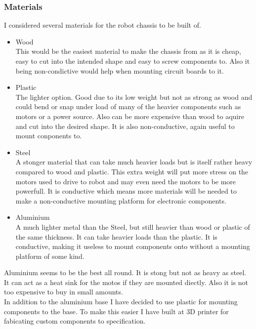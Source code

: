 \documentclass[11pt,fleqn,twoside]{article}
\begin{document}
\subsubsection{Materials}
I considered several materials for the robot chassis to be built of.
\begin{itemize}
\item Wood
\\This would be the easiest material to make the chassis from as it is cheap, easy to cut into the intended shape and easy to screw components to.  Also it being non-condictive would help when mounting circuit boards to it.
\item Plastic
\\The lighter option.  Good due to its low weight but not as strong as wood and could bend or snap under load of many of the heavier components such as motors or a power source.  Also can be more expensive than wood to aquire and cut into the desired shape.  It is also non-conductive, again useful to mount conponents to.
\item Steel
\\A stonger material that can take much heavier loads but is itself rather heavy compared to wood and plastic.  This extra weight will put more stress on the motors used to drive to robot and may even need the motors to be more powerfull.  It is conductive which means more materials will be needed to make a non-conductive mounting platform for electronic components.
\item Aluminium
\\A much lighter metal than the Steel, but still heavier than wood or plastic of the same thickness.  It can take heavier loads than the plastic. It is conductive, making it useless to mount components onto without a mounting platform of some kind.
\end{itemize}
Aluminium seems to be the best all round.  It is stong but not as heavy as steel.  It can act as a heat sink for the motos if they are mounted diectly.  Also it is not too expensive to buy in small amounts.
\\In addition to the aluminium base I have decided to use plastic for mounting components to the base.  To make this easier I have built at 3D printer for fabicating custom components to specification.
\end{document}
